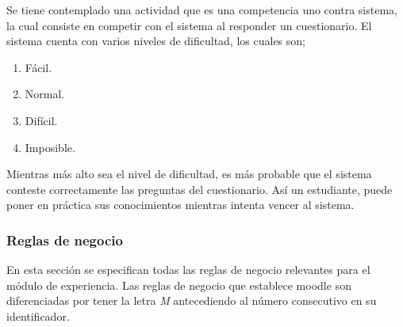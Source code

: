 

 \noindent Se tiene contemplado una actividad que es
 una competencia uno contra sistema, la cual consiste en competir con el sistema al responder un cuestionario.
   El sistema cuenta con varios niveles de dificultad, los cuales son; \\
   \begin{enumerate}
     \item Fácil.
     \item Normal.
     \item Difícil.
     \item Imposible.
   \end{enumerate}
   \noindent Mientras más alto sea el nivel de dificultad, es más probable que el sistema conteste correctamente las preguntas del cuestionario.
   Así un estudiante, puede poner en práctica sus conocimientos mientras intenta vencer al sistema.


\subsubsection{Reglas de negocio} %

 En esta sección se especifican todas las reglas de negocio relevantes para el módulo de
 experiencia. Las reglas de negocio que establece moodle son diferenciadas por tener la letra {\it M}
 antecediendo al número consecutivo en su identificador.


